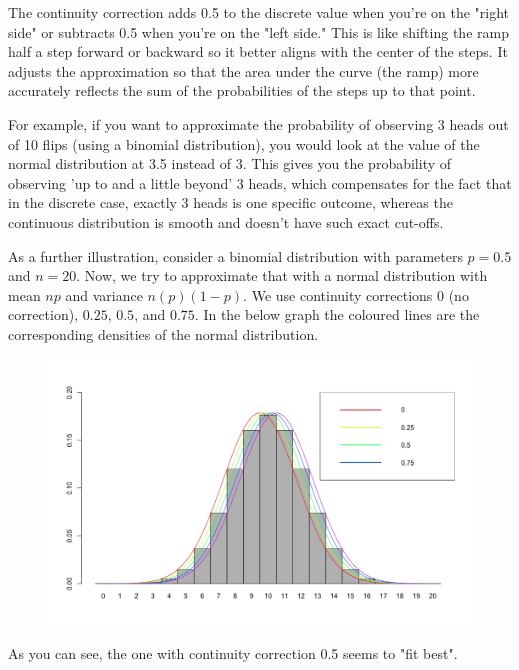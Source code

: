 \documentclass{article}
\begin{document}
The continuity correction adds 0.5 to the discrete value when you're on the "right side" or subtracts 0.5 when you're on the "left side." This is like shifting the ramp half a step forward or backward so it better aligns with the center of the steps. It adjusts the approximation so that the area under the curve (the ramp) more accurately reflects the sum of the probabilities of the steps up to that point.

For example, if you want to approximate the probability of observing 3 heads out of 10 flips (using a binomial distribution), you would look at the value of the normal distribution at 3.5 instead of 3. This gives you the probability of observing 'up to and a little beyond' 3 heads, which compensates for the fact that in the discrete case, exactly 3 heads is one specific outcome, whereas the continuous distribution is smooth and doesn't have such exact cut-offs.

As a further illustration, consider a binomial distribution with parameters \( p = 0.5 \) and \( n = 20 \).
Now, we try to approximate that with a normal distribution with mean \( np \) and variance
\( n(p)(1 - p) \). We use continuity corrections \( 0 \) (no correction), \( 0.25 \), \( 0.5 \), and \( 0.75 \). In the below
graph the coloured lines are the corresponding densities of the normal distribution.

\begin{figure}
    \centering
    \includegraphics[width=1\linewidth]{figures/gJSmv.jpg}
    \label{fig:enter-label}
\end{figure}
As you can see, the one with continuity correction 0.5 seems to "fit best".
\end{document}
